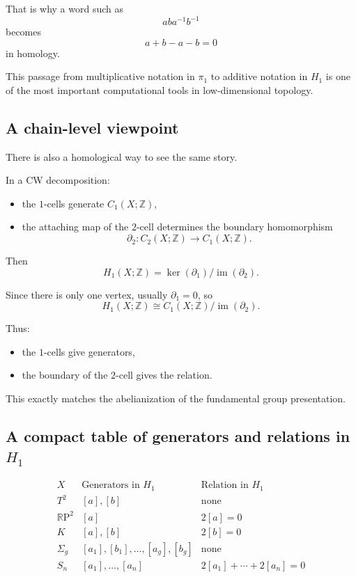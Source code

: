 \documentclass[12pt,a4paper]{article}
\newcommand{\RP}{\mathbb{R}\mathrm{P}}
\newcommand{\Z}{\mathbb{Z}}
\theoremstyle{notespace}
\begin{document}
That is why a word such as
\[
aba^{-1}b^{-1}
\]
becomes
\[
a+b-a-b=0
\]
in homology.

This passage from multiplicative notation in \(\pi_1\) to additive notation in \(H_1\) is one of the most important computational tools in low-dimensional topology.

\subsection{A chain-level viewpoint}

There is also a homological way to see the same story.

In a CW decomposition:
\begin{itemize}
	\item the \(1\)-cells generate \(C_1(X;\Z)\),
	\item the attaching map of the \(2\)-cell determines the boundary homomorphism
	\[
	\partial_2:C_2(X;\Z)\to C_1(X;\Z).
	\]
\end{itemize}

Then
\[
H_1(X;\Z)=\ker(\partial_1)/\operatorname{im}(\partial_2).
\]

Since there is only one vertex, usually \(\partial_1=0\), so
\[
H_1(X;\Z)\cong C_1(X;\Z)/\operatorname{im}(\partial_2).
\]

Thus:
\begin{itemize}
	\item the \(1\)-cells give generators,
	\item the boundary of the \(2\)-cell gives the relation.
\end{itemize}

This exactly matches the abelianization of the fundamental group presentation.

\subsection{A compact table of generators and relations in \(H_1\)}

\[
\begin{array}{c|c|c}
	X & \text{Generators in }H_1 & \text{Relation in }H_1 \\ \hline
	T^2 & [a],[b] & \text{none} \\
	\RP^2 & [a] & 2[a]=0 \\
	K & [a],[b] & 2[b]=0 \\
	\Sigma_g & [a_1],[b_1],\dots,[a_g],[b_g] & \text{none} \\
	S_n & [a_1],\dots,[a_n] & 2[a_1]+\cdots+2[a_n]=0
\end{array}
\]
\end{document}
